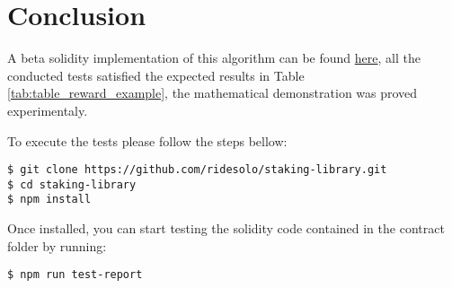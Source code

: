 \documentclass[a4paper]{article}
\begin{document}
\section{Conclusion}
\noindent
A beta solidity implementation of this algorithm can be found \href{https://github.com/RideSolo/solidity-staking}{here}, all the conducted tests satisfied the expected results in Table \ref{tab:table_reward_example}, the mathematical demonstration was proved experimentaly.\par

\noindent To execute the tests please follow the steps bellow:
\begin{lstlisting}
$ git clone https://github.com/ridesolo/staking-library.git
$ cd staking-library
$ npm install
\end{lstlisting}
\noindent Once installed, you can start testing the solidity code contained in the contract folder by running:
\begin{lstlisting}
$ npm run test-report
\end{lstlisting}
\end{document}
